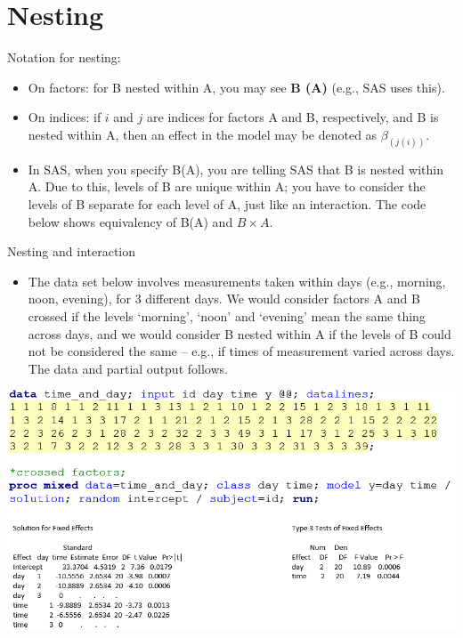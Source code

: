 \documentclass[
  9pt,
  ignorenonframetext,
]{beamer}
\providecommand{\tightlist}{%
  \setlength{\itemsep}{0pt}\setlength{\parskip}{0pt}}
\begin{document}
\hypertarget{nesting}{%
\section{Nesting}\label{nesting}}

\begin{frame}{Notation for nesting:}
\protect\hypertarget{notation-for-nesting}{}
\begin{itemize}
\item
  On factors: for B nested within A, you may see \textbf{B (A)} (e.g.,
  SAS uses this).
\item
  On indices: if \(i\) and \(j\) are indices for factors A and B,
  respectively, and B is nested within A, then an effect in the model
  may be denoted as \(\beta_{(j(i))}\).
\item
  In SAS, when you specify B(A), you are telling SAS that B is nested
  within A. Due to this, levels of B are unique within A; you have to
  consider the levels of B separate for each level of A, just like an
  interaction. The code below shows equivalency of B(A) and
  \(B \times A\).
\end{itemize}
\end{frame}

\begin{frame}{Nesting and interaction}
\protect\hypertarget{nesting-and-interaction}{}
\begin{itemize}
\tightlist
\item
  The data set below involves measurements taken within days (e.g.,
  morning, noon, evening), for 3 different days. We would consider
  factors A and B crossed if the levels `morning', `noon' and `evening'
  mean the same thing across days, and we would consider B nested within
  A if the levels of B could not be considered the same -- e.g., if
  times of measurement varied across days. The data and partial output
  follows.
\end{itemize}

\begin{center}\includegraphics[width=1\linewidth]{figs_L10/f1} \end{center}
\end{frame}
\end{document}
